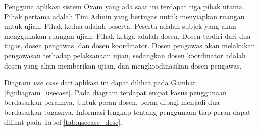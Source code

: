 Pengguna aplikasi sistem Oxam yang ada saat ini terdapat tiga pihak utama.
Pihak pertama adalah Tim Admin yang bertugas untuk menyiapkan ruangan
untuk ujian. Pihak kedua adalah peserta. Peserta adalah subjek yang akan
menggunakan ruangan ujian. Pihak ketiga adalah dosen. Dosen terdiri dari
dua tugas, dosen pengawas, dan dosen koordinator. Dosen pengawas akan melakukan
pengawasan terhadap pelaksanaan ujian, sedangkan dosen koordinator adalah
dosen yang akan memberikan ujian, dan mengkoodinasikan dosen pengawas.

Diagram \textit{use case} dari aplikasi ini dapat dilihat pada Gambar 
\ref{fig:diagram_usecase}. Pada diagram terdapat empat kasus penggunaan berdasarkan
perannya. Untuk peran dosen, peran dibagi menjadi dua berdasarkan tugasnya. 
Informasi lengkap tentang penggunaan tiap peran dapat dilihat pada Tabel \ref{tab:usecase_desc}.

